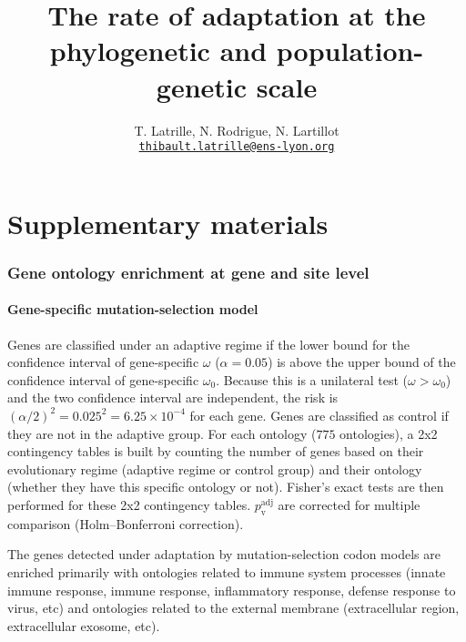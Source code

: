 \documentclass{article}
\title{The rate of adaptation at the phylogenetic and population-genetic scale}
\author{
    \large
    T. {Latrille}, N. {Rodrigue}, N. {Lartillot}\\
    \normalsize
    \texttt{\href{mailto:thibault.latrille@ens-lyon.org}{thibault.latrille@ens-lyon.org}} \\
}
\begin{document}
    \maketitle
    \part*{Supplementary materials}
    \tableofcontents
    \pagebreak

    \section{Gene ontology enrichment at gene and site level}
    \label{sec:gene-ontology-enrichment}

    \subsection{Gene-specific mutation-selection model}

    Genes are classified under an adaptive regime if the lower bound for the confidence interval of gene-specific $\omega$ ($\alpha=0.05$) is above the upper bound of the confidence interval of gene-specific $\omega_{0}$.
    Because this is a unilateral test ($\omega > \omega_{0}$) and the two confidence interval are independent, the risk is $(\alpha/2)^2=0.025^2=6.25 \times 10^{-4}$ for each gene.
    Genes are classified as control if they are not in the adaptive group.
    For each ontology ($775$ ontologies), a 2x2 contingency tables is built by counting the number of genes based on their evolutionary regime (adaptive regime or control group) and their ontology (whether they have this specific ontology or not).
    Fisher's exact tests are then performed for these 2x2 contingency tables.
    $p_{\mathrm{v}}^{\mathrm{adj}}$ are corrected for multiple comparison (Holm–Bonferroni correction).

    \begin{center}
        \footnotesize
        
    \end{center}
    The genes detected under adaptation by mutation-selection codon models are enriched primarily with ontologies related to immune system processes (innate immune response, immune response, inflammatory response, defense response to virus, etc) and ontologies related to the external membrane (extracellular region, extracellular exosome, etc).
\end{document}
